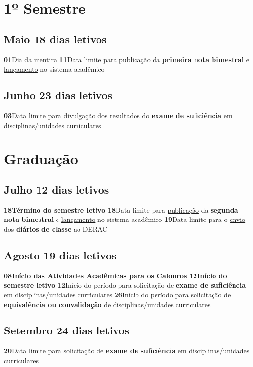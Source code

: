 \documentclass[thesis]{hmcposter}
\begin{document}
\begin{poster}
\section{\hfill \color{hmcorange}1º Semestre}
\subsection{Maio \hfill 18 dias letivos}\textbf{01}\qquad Dia da mentira \newline \null\textbf{11}\qquad Data limite para \underline{publicação} da \textbf{primeira nota bimestral} e \underline{lançamento} no sistema acadêmico \newline \null\subsection{Junho \hfill 23 dias letivos}\textbf{03}\qquad Data limite para divulgação dos resultados do \textbf{exame de suficiência} em disciplinas/unidades curriculares \newline \null\newpage
\section{\color{hmcorange}Graduação}\subsection{Julho \hfill 12 dias letivos}\textbf{18}\qquad \textbf{Término do semestre letivo} \newline \null\textbf{18}\qquad Data limite para \underline{publicação} da \textbf{segunda nota bimestral} e \underline{lançamento} no sistema acadêmico \newline \null\textbf{19}\qquad Data limite para o \underline{envio} dos \textbf{diários de classe} ao DERAC \newline \null\subsection{Agosto \hfill 19 dias letivos}\textbf{08}\qquad \textbf{Início das Atividades Acadêmicas para os Calouros} \newline \null\textbf{12}\qquad \textbf{Início do semestre letivo} \newline \null\textbf{12}\qquad Início do período para solicitação de \textbf{exame de suficiência} em disciplinas/unidades curriculares \newline \null\textbf{26}\qquad Início do período para solicitação de \textbf{equivalência ou convalidação} de disciplinas/unidades curriculares \newline \null\subsection{Setembro \hfill 24 dias letivos}\textbf{20}\qquad Data limite para solicitação de \textbf{exame de suficiência} em disciplinas/unidades curriculares \newline \null\vfill\null
\columnbreak

\end{poster}
\end{document}
